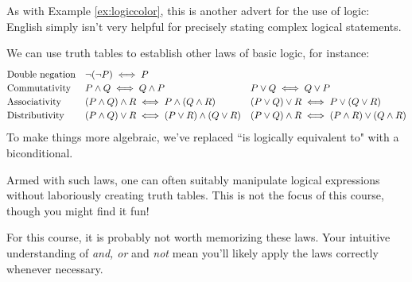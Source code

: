 As with Example \ref{ex:logiccolor}, this is another advert for the use of logic: English simply isn't very helpful for precisely stating complex logical statements.


\begin{aside}{}{}
\label{pg:asidelogicalgebra}

We can use truth tables to establish other laws of basic logic, for instance:
\[
	\def\arraystretch{1.2}
	\begin{array}{@{}lll@{}}
	\text{Double negation} & \neg(\neg P)\iff P &\\
	\text{Commutativity} & P\wedge Q\iff Q\wedge P & P\vee Q\iff Q\vee P\\
	\text{Associativity} & (P\wedge Q)\wedge R\iff P\wedge(Q\wedge R) & (P\vee Q)\vee R\iff P\vee(Q\vee R)\\
	\text{Distributivity}&(P\wedge Q)\vee R\iff (P\vee R)\wedge (Q\vee R) & (P\vee Q)\wedge R\iff (P\wedge R)\vee (Q\wedge R)
	\end{array}
\]
To make things more algebraic, we've replaced ``is logically equivalent to" with a biconditional.\footnotemark{}\smallbreak

Armed with such laws, one can often suitably manipulate logical expressions without laboriously creating truth tables. This is not the focus of this course, though you might find it fun!\smallbreak

For this course, it is probably not worth memorizing these laws. Your intuitive understanding of \emph{and, or} and \emph{not} mean you'll likely apply the laws correctly whenever necessary.
\end{aside}


\goodbreak

